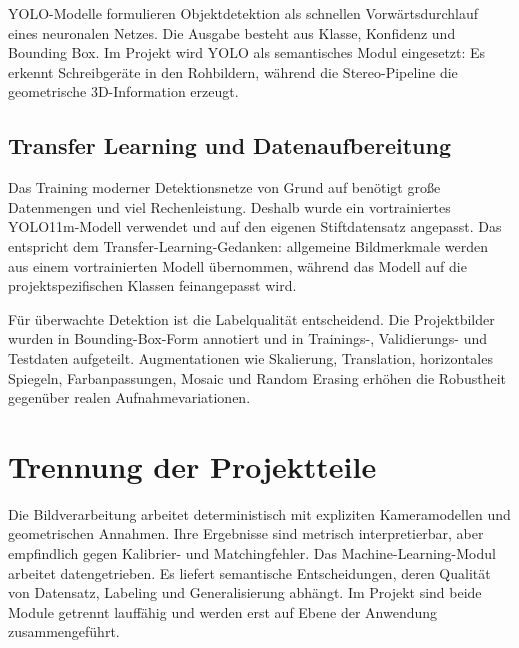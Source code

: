 YOLO-Modelle formulieren Objektdetektion als schnellen Vorwärtsdurchlauf eines neuronalen
Netzes. Die Ausgabe besteht aus Klasse, Konfidenz und Bounding Box. Im Projekt wird YOLO als
semantisches Modul eingesetzt: Es erkennt Schreibgeräte in den Rohbildern, während die
Stereo-Pipeline die geometrische 3D-Information erzeugt.

\subsection{Transfer Learning und Datenaufbereitung}

Das Training moderner Detektionsnetze von Grund auf benötigt große Datenmengen und viel
Rechenleistung. Deshalb wurde ein vortrainiertes YOLO11m-Modell verwendet und auf den eigenen
Stiftdatensatz angepasst. Das entspricht dem Transfer-Learning-Gedanken: allgemeine
Bildmerkmale werden aus einem vortrainierten Modell übernommen, während das Modell auf die
projektspezifischen Klassen feinangepasst wird.

Für überwachte Detektion ist die Labelqualität entscheidend. Die Projektbilder wurden in
Bounding-Box-Form annotiert und in Trainings-, Validierungs- und Testdaten aufgeteilt.
Augmentationen wie Skalierung, Translation, horizontales Spiegeln, Farbanpassungen, Mosaic
und Random Erasing erhöhen die Robustheit gegenüber realen Aufnahmevariationen.

\section{Trennung der Projektteile}

Die Bildverarbeitung arbeitet deterministisch mit expliziten Kameramodellen und
geometrischen Annahmen. Ihre Ergebnisse sind metrisch interpretierbar, aber empfindlich
gegen Kalibrier- und Matchingfehler. Das Machine-Learning-Modul arbeitet datengetrieben. Es
liefert semantische Entscheidungen, deren Qualität von Datensatz, Labeling und
Generalisierung abhängt. Im Projekt sind beide Module getrennt lauffähig und werden erst auf
Ebene der Anwendung zusammengeführt.
